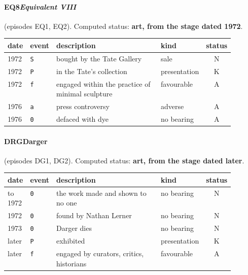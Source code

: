 \paragraph{EQ8\enspace \emph{Equivalent VIII}} (episodes EQ1, EQ2). Computed status: \textbf{art, from the stage dated 1972}.
\begin{center}\footnotesize\begin{tabular}{@{}llp{0.52\linewidth}lc@{}}
date & event & description & kind & status \\ \midrule
1972 & \texttt{S} & bought by the Tate Gallery & sale & N \\
1972 & \texttt{P} & in the Tate's collection & presentation & K \\
1972 & \texttt{f} & engaged within the practice of minimal sculpture & favourable & A \\
1976 & \texttt{a} & press controversy & adverse & A \\
1976 & \texttt{0} & defaced with dye & no bearing & A \\
\end{tabular}\end{center}

\paragraph{DRG\enspace Darger} (episodes DG1, DG2). Computed status: \textbf{art, from the stage dated later}.
\begin{center}\footnotesize\begin{tabular}{@{}llp{0.52\linewidth}lc@{}}
date & event & description & kind & status \\ \midrule
to 1972 & \texttt{0} & the work made and shown to no one & no bearing & N \\
1972 & \texttt{0} & found by Nathan Lerner & no bearing & N \\
1973 & \texttt{0} & Darger dies & no bearing & N \\
later & \texttt{P} & exhibited & presentation & K \\
later & \texttt{f} & engaged by curators, critics, historians & favourable & A \\
\end{tabular}\end{center}

